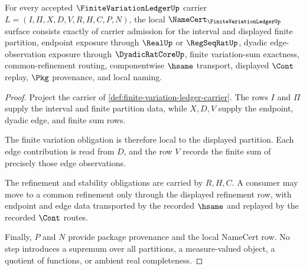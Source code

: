 \begin{theorem}
\label{thm:finite-variation-ledger-namecert-obligations}
For every accepted $\FiniteVariationLedgerUp$ carrier $L=(I,\Pi,X,D,V,R,H,C,P,N)$, the local $\NameCert_{\FiniteVariationLedgerUp}$ surface consists exactly of carrier admission for the interval and displayed finite partition, endpoint exposure through $\RealUp$ or $\RegSeqRatUp$, dyadic edge-observation exposure through $\DyadicRatCoreUp$, finite variation-sum exactness, common-refinement routing, componentwise $\hsame$ transport, displayed $\Cont$ replay, $\Pkg$ provenance, and local naming.
\end{theorem}
\begin{proof}
Project the carrier of \autoref{def:finite-variation-ledger-carrier}. The rows $I$ and $\Pi$ supply the interval and finite partition data, while $X,D,V$ supply the endpoint, dyadic edge, and finite sum rows.

The finite variation obligation is therefore local to the displayed partition. Each edge contribution is read from $D$, and the row $V$ records the finite sum of precisely those edge observations.

The refinement and stability obligations are carried by $R,H,C$. A consumer may move to a common refinement only through the displayed refinement row, with endpoint and edge data transported by the recorded $\hsame$ and replayed by the recorded $\Cont$ routes.

Finally, $P$ and $N$ provide package provenance and the local NameCert row. No step introduces a supremum over all partitions, a measure-valued object, a quotient of functions, or ambient real completeness.
\end{proof}

